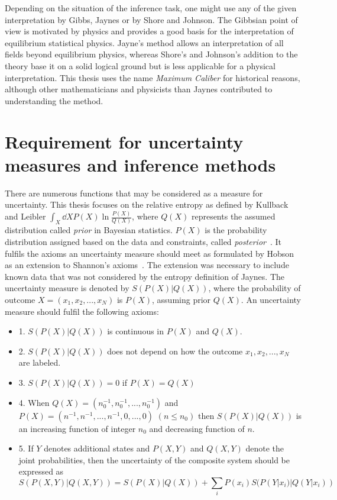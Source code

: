 Depending on the situation of the inference task, one might 
use any of the given interpretation by Gibbs, Jaynes or by Shore and Johnson. 
The Gibbsian point of view is motivated by physics and provides a good 
basis for the interpretation of equilibrium statistical physics. Jayne's method 
allows an interpretation of all fields beyond equilibrium physics, whereas Shore's and Johnson's addition to the theory base it on a solid logical ground but is less applicable for a physical interpretation. This thesis uses the name \textit{Maximum Caliber} for historical reasons, although other mathematicians and physicists than Jaynes contributed to understanding the method.  



\section{Requirement for uncertainty measures and inference methods}
\label{sec:inference}
There are numerous functions that may be considered as a measure for uncertainty.
This thesis focuses on the relative entropy as defined by Kullback and Leibler 
$ \int_X \dd{X} P(X) \ln \frac{P(X)}{Q(X)}$, where $Q(X)$ represents the assumed distribution called \textit{prior} in Bayesian statistics. $P(X)$ is the probability distribution assigned based on the data and constraints, called \textit{posterior}~\cite{jaynes2003probability}. It fulfils the axioms an uncertainty measure should meet as formulated by Hobson~\cite{hobson1973comparison} as an extension to Shannon's axioms~\cite{shannon1948mathematical}. 
The extension was necessary to include known data that 
was not considered by the entropy definition of Jaynes. 
The uncertainty measure is denoted by $S(P(X)|Q(X))$, where
the probability of outcome $X= (x_1, x_2,...,x_N)$ is $P(X)$, assuming prior $Q(X)$. An uncertainty measure should fulfil the following axioms:
\begin{itemize}
 \item 1. $S(P(X)|Q(X))$ is continuous in $P(X)$ and $Q(X)$.
 \item 2. $S(P(X)|Q(X))$ does not depend on how the outcome $x_1,x_2, ... , x_N$ 
 are labeled.
 \item 3. $S(P(X)|Q(X)) = 0$ if $P(X) = Q(X)$ 
 \item 4. When $Q(X) = (n_0^{-1}, n_0^{-1} , ... , n_0^{-1})$ and 
 $P(X) = (n^{-1}, n^{-1} , ... , n^{-1},0,...,0)$ $(n \leq n_0)$ then 
 $S(P(X)|Q(X))$ is an increasing function of integer $n_0$ and decreasing function of $n$.  
\item 5. If $Y$ denotes additional states and $P(X,Y)$ and $Q(X,Y)$ denote the 
joint probabilities, then the uncertainty of the composite system should be expressed as
\begin{equation}
   S(P(X,Y)|Q(X,Y)) = S(P(X)|Q(X)) + \sum_i P(x_i) S(P(Y | x_i) | Q(Y | x_i)) %
\end{equation}
\end{itemize}
